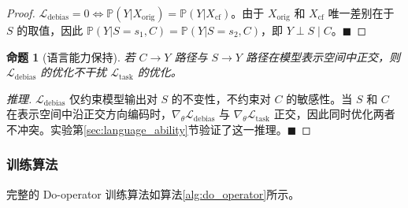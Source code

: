 \documentclass[12pt,a4paper,oneside]{ctexart}
\newtheorem{proposition}{命题}[section]
\newcommand{\Ltask}{\mathcal{L}_{\text{task}}}
\newcommand{\Ldebias}{\mathcal{L}_{\text{debias}}}
\renewcommand{\P}{\mathbb{P}}
\begin{document}
\begin{proof}
  $\Ldebias = 0 \iff \P(Y|X_{\text{orig}}) = \P(Y|X_{\text{cf}})$。由于 $X_{\text{orig}}$ 和 $X_{\text{cf}}$ 唯一差别在于 $S$ 的取值，因此 $\P(Y|S=s_1, C) = \P(Y|S=s_2, C)$，即 $Y \perp S \mid C$。$\blacksquare$
\end{proof}

\begin{proposition}[语言能力保持]\label{proposition:language}
  若 $C \to Y$ 路径与 $S \to Y$ 路径在模型表示空间中正交，则 $\Ldebias$ 的优化不干扰 $\Ltask$ 的优化。
\end{proposition}

\begin{proof}[推理]
  $\Ldebias$ 仅约束模型输出对 $S$ 的不变性，不约束对 $C$ 的敏感性。当 $S$ 和 $C$ 在表示空间中沿正交方向编码时，$\nabla_{\theta}\Ldebias$ 与 $\nabla_{\theta}\Ltask$ 正交，因此同时优化两者不冲突。实验第\ref{sec:language_ability}节验证了这一推理。$\blacksquare$
\end{proof}

\subsubsection{训练算法}

完整的 Do-operator 训练算法如算法\ref{alg:do_operator}所示。
\end{document}
